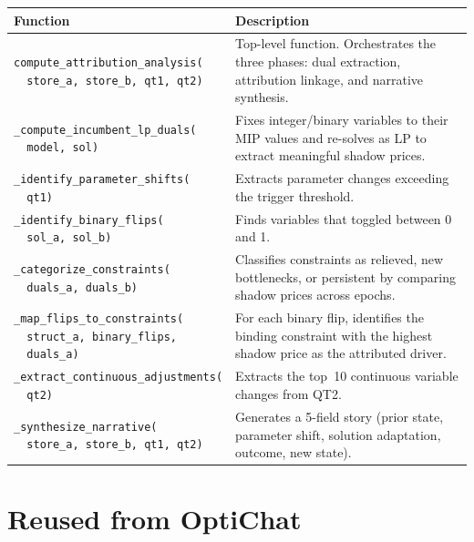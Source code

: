 \documentclass[11pt, a4paper]{article}
\begin{document}
\begin{longtable}{p{5.5cm} p{9cm}}
\toprule
\textbf{Function} & \textbf{Description} \\
\midrule
\texttt{compute\_attribution\_analysis(\\ ~~store\_a, store\_b, qt1, qt2)} &
    Top-level function.  Orchestrates the three phases: dual
    extraction, attribution linkage, and narrative synthesis. \\
\midrule
\texttt{\_compute\_incumbent\_lp\_duals(\\ ~~model, sol)} &
    Fixes integer/binary variables to their MIP values and re-solves
    as LP to extract meaningful shadow prices. \\
\midrule
\texttt{\_identify\_parameter\_shifts(\\ ~~qt1)} &
    Extracts parameter changes exceeding the trigger threshold. \\
\midrule
\texttt{\_identify\_binary\_flips(\\ ~~sol\_a, sol\_b)} &
    Finds variables that toggled between 0 and 1. \\
\midrule
\texttt{\_categorize\_constraints(\\ ~~duals\_a, duals\_b)} &
    Classifies constraints as relieved, new bottlenecks, or
    persistent by comparing shadow prices across epochs. \\
\midrule
\texttt{\_map\_flips\_to\_constraints(\\ ~~struct\_a, binary\_flips,\\ ~~duals\_a)} &
    For each binary flip, identifies the binding constraint with the
    highest shadow price as the attributed driver. \\
\midrule
\texttt{\_extract\_continuous\_adjustments(\\ ~~qt2)} &
    Extracts the top~10 continuous variable changes from QT2. \\
\midrule
\texttt{\_synthesize\_narrative(\\ ~~store\_a, store\_b, qt1, qt2)} &
    Generates a 5-field story (prior state, parameter shift, solution
    adaptation, outcome, new state). \\
\bottomrule
\end{longtable}


\section{Reused from OptiChat}
\label{sec:reused}
\end{document}
